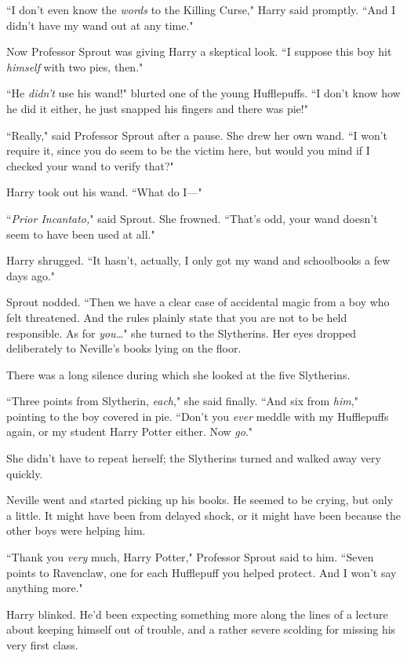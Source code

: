 ``I don't even know the \emph{words} to the Killing Curse," Harry said promptly. ``And I didn't have my wand out at any time."

Now Professor Sprout was giving Harry a skeptical look. ``I suppose this boy hit \emph{himself} with two pies, then."

``He \emph{didn't} use his wand!" blurted one of the young Hufflepuffs. ``I don't know how he did it either, he just snapped his fingers and there was pie!"

``Really," said Professor Sprout after a pause. She drew her own wand. ``I won't require it, since you do seem to be the victim here, but would you mind if I checked your wand to verify that?"

Harry took out his wand. ``What do I—"

``\emph{Prior Incantato,}" said Sprout. She frowned. ``That's odd, your wand doesn't seem to have been used at all."

Harry shrugged. ``It hasn't, actually, I only got my wand and schoolbooks a few days ago."

Sprout nodded. ``Then we have a clear case of accidental magic from a boy who felt threatened. And the rules plainly state that you are not to be held responsible. As for \emph{you{\ldots}}" she turned to the Slytherins. Her eyes dropped deliberately to Neville's books lying on the floor.

There was a long silence during which she looked at the five Slytherins.

``Three points from Slytherin, \emph{each}," she said finally. ``And six from \emph{him}," pointing to the boy covered in pie. ``Don't you \emph{ever} meddle with my Hufflepuffs again, or my student Harry Potter either. Now \emph{go}."

She didn't have to repeat herself; the Slytherins turned and walked away very quickly.

Neville went and started picking up his books. He seemed to be crying, but only a little. It might have been from delayed shock, or it might have been because the other boys were helping him.

``Thank you \emph{very} much, Harry Potter," Professor Sprout said to him. ``Seven points to Ravenclaw, one for each Hufflepuff you helped protect. And I won't say anything more."

Harry blinked. He'd been expecting something more along the lines of a lecture about keeping himself out of trouble, and a rather severe scolding for missing his very first class.

